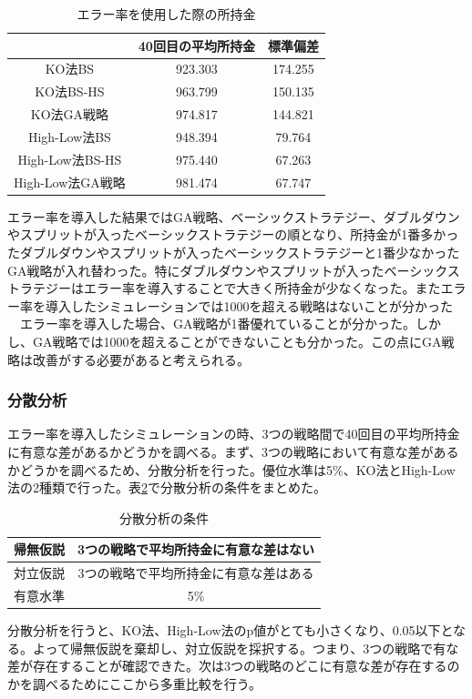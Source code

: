 \begin{table}[H]
 \caption{エラー率を使用した際の所持金\label{money-err}}
 \begin{center}
  \begin{tabular}{|c|c|c|}
  \hline  & 40回目の平均所持金 & 標準偏差 \\
  \hline KO法BS & 923.303 & 174.255\\
  \hline KO法BS-HS & 963.799 & 150.135 \\
  \hline KO法GA戦略 & 974.817 & 144.821\\
  \hline High-Low法BS & 948.394 & 79.764\\
  \hline High-Low法BS-HS  & 975.440 & 67.263\\
  \hline High-Low法GA戦略 & 981.474 & 67.747\\
  \hline
  \end{tabular}
 \end{center}
\end{table}
エラー率を導入した結果ではGA戦略、ベーシックストラテジー、ダブルダウンやスプリットが入ったベーシックストラテジーの順となり、所持金が1番多かったダブルダウンやスプリットが入ったベーシックストラテジーと1番少なかったGA戦略が入れ替わった。特にダブルダウンやスプリットが入ったベーシックストラテジーはエラー率を導入することで大きく所持金が少なくなった。またエラー率を導入したシミュレーションでは1000を超える戦略はないことが分かった\\
　エラー率を導入した場合、GA戦略が1番優れていることが分かった。しかし、GA戦略では1000を超えることができないことも分かった。この点にGA戦略は改善がする必要があると考えられる。

\subsubsection{分散分析}
エラー率を導入したシミュレーションの時、3つの戦略間で40回目の平均所持金に有意な差があるかどうかを調べる。まず、3つの戦略において有意な差があるかどうかを調べるため、分散分析を行った。優位水準は5\%、KO法とHigh-Low法の2種類で行った。表\ref{conditions-b}で分散分析の条件をまとめた。
\begin{table}[H]
 \caption{分散分析の条件\label{conditions-b}}
 \begin{center}
  \begin{tabular}{|c|c|}
  \hline 帰無仮説 & 3つの戦略で平均所持金に有意な差はない \\
  \hline 対立仮説 & 3つの戦略で平均所持金に有意な差はある \\
  \hline 有意水準 & 5\% \\
  \hline
  \end{tabular}
 \end{center}
\end{table}
分散分析を行うと、KO法、High-Low法のp値がとても小さくなり、0.05以下となる。よって帰無仮説を棄却し、対立仮説を採択する。つまり、3つの戦略で有な差が存在することが確認できた。次は3つの戦略のどこに有意な差が存在するのかを調べるためにここから多重比較を行う。

